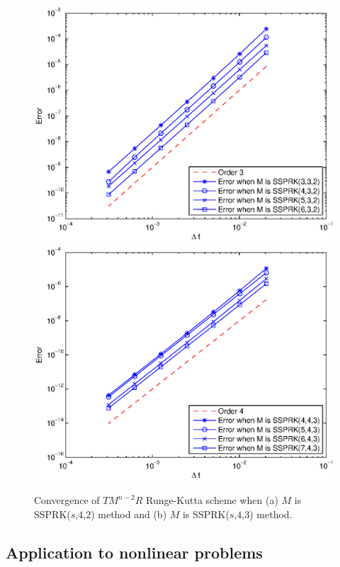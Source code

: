 \begin{figure}[t!]
    \centering
    \includegraphics[scale=0.6]{Pictures/convergence_3rd_ord.eps}\includegraphics[scale=0.6]{Pictures/convergence_4th_ord_(2).eps}
    \caption{Convergence of $TM^{n-2}R$ Runge-Kutta scheme when (a) $M$ is SSPRK($s $,$ 4 $,$ 2 $) method and (b) $ M $ is SSPRK($ s $,$ 4 $,$ 3 $) method.}
    \label{fig5.2}
\end{figure}

\subsection{Application to nonlinear problems}\label{subsec:nonlinear_problems}

